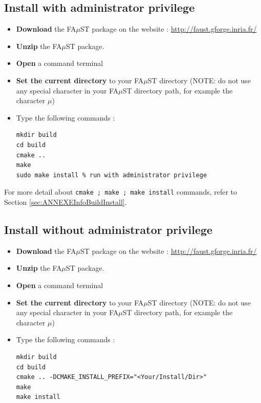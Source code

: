 \begin{itemize}
\subsection{Install with administrator privilege}\label{sec:UnixBuildInstallAdmin}

\begin{itemize}
\item \textbf{Download} the FA$\mu$ST package on the website :  \url{http://faust.gforge.inria.fr/}
\item \textbf{Unzip} the FA$\mu$ST package.
\item \textbf{Open} a command terminal
\item \textbf{Set the current directory} to your FA$\mu$ST directory (NOTE: do not use any special character in your FA$\mu$ST directory path, for example the character $\mu$)
\item Type the following commands : 
\begin{lstlisting}
mkdir build
cd build
cmake ..
make
sudo make install % run with administrator privilege
\end{lstlisting}
\end{itemize}

For more detail about \texttt{cmake ; make ; make install} commands, refer to Section \ref{sec:ANNEXEInfoBuildInstall}.


\subsection{Install without administrator privilege}\label{sec:UnixBuildInstallNOAdmin}

\begin{itemize}
\item \textbf{Download} the FA$\mu$ST package on the website :  \url{http://faust.gforge.inria.fr/}
\item \textbf{Unzip} the FA$\mu$ST package.
\item \textbf{Open} a command terminal
\item \textbf{Set the current directory} to your FA$\mu$ST directory (NOTE: do not use any special character in your FA$\mu$ST directory path, for example the character $\mu$)
\item Type the following commands : 
\begin{lstlisting}
mkdir build
cd build
cmake .. -DCMAKE_INSTALL_PREFIX="<Your/Install/Dir>"
make
make install
\end{lstlisting}
\end{itemize}


\end{itemize}
